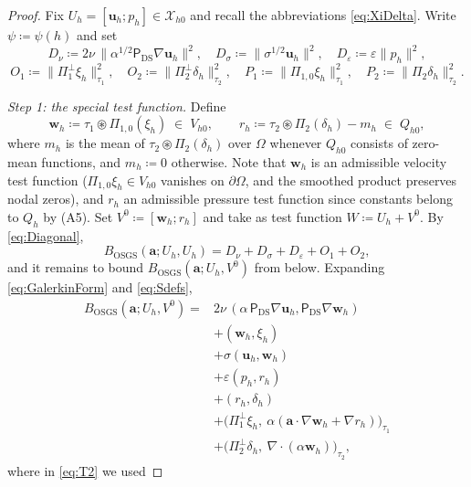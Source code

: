 \documentclass[11pt]{article}
\theoremstyle{remark}
\newcommand{\bu}{\boldsymbol{u}}
\newcommand{\bw}{\boldsymbol{w}}
\newcommand{\ba}{\boldsymbol{a}}
\newcommand{\ViscProj}{\mathsf{P}_{\mathrm{DS}}}
\newcommand{\norm}[1]{\lVert #1 \rVert}
\newcommand{\smul}{\circledast}
\newcommand{\Ptwo}{\Pi_{2}}
\newcommand{\Ponez}{\Pi_{1,0}}
\newcommand{\Poneo}{\Pi_{1}^{\perp}}
\newcommand{\Ptwoo}{\Pi_{2}^{\perp}}
\newcommand{\Xhz}{\mathcal{X}_{h0}}
\begin{document}
\begin{proof}
Fix $U_h = [\bu_h; p_h] \in \Xhz$ and recall the abbreviations \cref{eq:XiDelta}.
Write $\psi \coloneqq \psi(h)$ and set
\[
  D_\nu \coloneqq 2\nu\,\bigl\lVert \alpha^{1/2}\ViscProj\nabla\bu_h \bigr\rVert^2,
  \quad
  D_\sigma \coloneqq \norm{\sigma^{1/2}\bu_h}^2,
  \quad
  D_\varepsilon \coloneqq \varepsilon\norm{p_h}^2,
\]
\[
  O_1 \coloneqq \norm{\Poneo\xi_h}_{\tau_1}^2,
  \quad
  O_2 \coloneqq \norm{\Ptwoo\delta_h}_{\tau_2}^2,
  \quad
  P_1 \coloneqq \norm{\Ponez\xi_h}_{\tau_1}^2,
  \quad
  P_2 \coloneqq \norm{\Ptwo\delta_h}_{\tau_2}^2 .
\]

\medskip\noindent\emph{Step 1: the special test function.}
Define
\[
  \bw_h \coloneqq \tau_1 \smul \Ponez(\xi_h) \;\in\; V_{h0},
  \qquad
  r_h \coloneqq \tau_2 \smul \Ptwo(\delta_h) - m_h \;\in\; Q_{h0},
\]
where $m_h$ is the mean of $\tau_2\smul\Ptwo(\delta_h)$ over $\Omega$ whenever
$Q_{h0}$ consists of zero-mean functions, and $m_h \coloneqq 0$ otherwise. Note that
$\bw_h$ is an admissible velocity test function ($\Ponez\xi_h \in V_{h0}$ vanishes on
$\partial\Omega$, and the smoothed product preserves nodal zeros), and $r_h$ an
admissible pressure test function since constants belong to $Q_h$ by (A5). Set
$V^0 \coloneqq [\bw_h; r_h]$ and take as test function $W \coloneqq U_h + V^0$.
By \cref{eq:Diagonal},
\begin{equation}
  \label{eq:StepDiag}
  B_{\mathrm{OSGS}}(\ba; U_h, U_h) = D_\nu + D_\sigma + D_\varepsilon + O_1 + O_2 ,
\end{equation}
and it remains to bound $B_{\mathrm{OSGS}}(\ba; U_h, V^0)$ from below. Expanding
\cref{eq:GalerkinForm} and \cref{eq:Sdefs},
\begin{align}
  B_{\mathrm{OSGS}}(\ba; U_h, V^0)
  ={}& 2\nu\,(\alpha\,\ViscProj\nabla\bu_h, \ViscProj\nabla\bw_h)
  \tag{T1}\label{eq:T1}\\
  &+ (\bw_h, \xi_h)
  \tag{T2}\label{eq:T2}\\
  &+ \sigma(\bu_h, \bw_h)
  \tag{T3}\label{eq:T3}\\
  &+ \varepsilon(p_h, r_h)
  \tag{T4}\label{eq:T4}\\
  &+ (r_h, \delta_h)
  \tag{T5}\label{eq:T5}\\
  &+ \bigl(\Poneo\xi_h,\ \alpha(\ba\cdot\nabla\bw_h + \nabla r_h)\bigr)_{\tau_1}
  \tag{T6}\label{eq:T6}\\
  &+ \bigl(\Ptwoo\delta_h,\ \nabla\cdot(\alpha\bw_h)\bigr)_{\tau_2},
  \tag{T7}\label{eq:T7}
\end{align}
where in \cref{eq:T2} we used

\end{proof}
\end{document}
